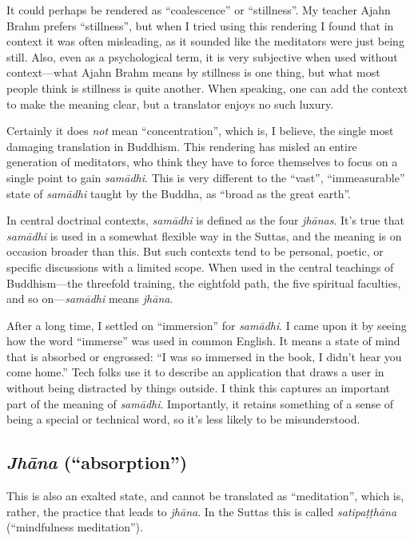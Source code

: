 \documentclass[12pt,openany]{book}%
\begin{document}
It could perhaps be rendered as “coalescence” or “stillness”. My teacher Ajahn Brahm prefers “stillness”, but when I tried using this rendering I found that in context it was often misleading, as it sounded like the meditators were just being still. Also, even as a psychological term, it is very subjective when used without context—what Ajahn Brahm means by stillness is one thing, but what most people think is stillness is quite another. When speaking, one can add the context to make the meaning clear, but a translator enjoys no such luxury.

Certainly it does \emph{not} mean “concentration”, which is, I believe, the single most damaging translation in Buddhism. This rendering has misled an entire generation of meditators, who think they have to force themselves to focus on a single point to gain \textit{\textsanskrit{samādhi}}. This is very different to the “vast”, “immeasurable” state of \textit{\textsanskrit{samādhi}} taught by the Buddha, as “broad as the great earth”.

In central doctrinal contexts, \textit{\textsanskrit{samādhi}} is defined as the four \textit{\textsanskrit{jhānas}}. It’s true that  \textit{\textsanskrit{samādhi}} is used in a somewhat flexible way in the Suttas, and the meaning is on occasion broader than this. But such contexts tend to be personal, poetic, or specific discussions with a limited scope. When used in the central teachings of Buddhism—the threefold training, the eightfold path, the five spiritual faculties, and so on—\textit{\textsanskrit{samādhi}} means \textit{\textsanskrit{jhāna}}.

After a long time, I settled on “immersion” for \textit{\textsanskrit{samādhi}}. I came upon it by seeing how the word “immerse” was used in common English. It means a state of mind that is absorbed or engrossed: “I was so immersed in the book, I didn’t hear you come home.” Tech folks use it to describe an application that draws a user in without being distracted by things outside. I think this captures an important part of the meaning of \textit{\textsanskrit{samādhi}}. Importantly, it retains something of a sense of being a special or technical word, so it’s less likely to be misunderstood.

\subsection*{\textit{\textsanskrit{Jhāna}} (“absorption”)}

This is also an exalted state, and cannot be translated as “meditation”, which is, rather, the practice that leads to \textit{\textsanskrit{jhāna}}. In the Suttas this is called \textit{\textsanskrit{satipaṭṭhāna}} (“mindfulness meditation”).
\end{document}
